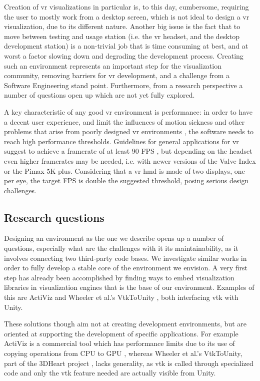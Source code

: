 Creation of \acrshort{vr} visualizations in particular is, to this day, cumbersome, requiring the user to mostly work from a desktop screen, which is not ideal to design a \acrshort{vr} visualization, due to its different nature. Another big issue is the fact that to move between testing and usage station (i.e. the \acrshort{vr} headset, and the desktop development station) is a non-trivial job that is time consuming at best, and at worst a factor slowing down and degrading the development process. Creating such an environment represents an important step for the visualization community, removing barriers for \acrshort{vr} development, and a challenge from a Software Engineering stand point. Furthermore, from a research perspective a number of questions open up which are not yet fully explored.

A key characteristic of any good \acrshort{vr} environment is performance: in order to have a decent user experience, and limit the influences of motion sickness and other problems that arise from poorly designed \acrshort{vr} environments \cite{viire1997health}, the software needs to reach high performance thresholds. Guidelines for general applications for \acrshort{vr} suggest to achieve a framerate of at least 90 FPS \cite{unity_vr_2020}, but depending on the headset even higher framerates may be needed, i.e. with newer versions of the Valve Index or the Pimax 5K plus. Considering that a \acrshort{vr} \acrfull{hmd} is made of two displays, one per eye, the target FPS is double the suggested threshold, posing serious design challenges.

\subsection{Research questions}

Designing an environment as the one we describe opens up a number of questions, especially what are the challenges with it its maintainability, as it involves connecting two third-party code bases. We investigate similar works in order to fully develop a stable core of the environment we envision. A very first step has already been accomplished by finding ways to embed visualization libraries in visualization engines that is the base of our environment. Examples of this are ActiViz \cite{kitware_activiz} and Wheeler et al.'s VtkToUnity \cite{wheeler_virtual_2018}, both interfacing \acrshort{vtk} with Unity.

These solutions though aim not at creating development environments, but are oriented at supporting the development of specific applications. For example ActiViz is a commercial tool which has performance limits due to its use of copying operations from CPU to GPU \cite{gregg2011data}, whereas Wheeler et al.'s VtkToUnity, part of the 3DHeart project \cite{wheeler_virtual_2018}, lacks generality, as \acrshort{vtk} is called through specialized code and only the \acrshort{vtk} feature needed are actually visible from Unity.

